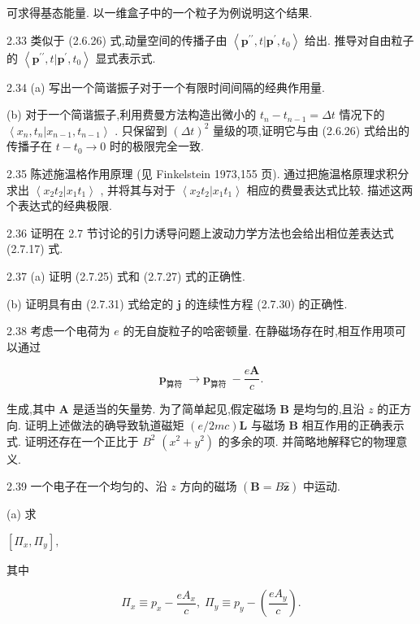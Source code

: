 \documentclass[lang=cn,newtx,10pt,scheme=chinese,thmcnt=section]{elegantbook}
\begin{document}
可求得基态能量. 以一维盒子中的一个粒子为例说明这个结果.

2.33 类似于 (2.6.26) 式,动量空间的传播子由 $\left\langle {{\mathbf{p}}^{\prime \prime }, t | {\mathbf{p}}^{\prime },{t}_{0}}\right\rangle$ 给出. 推导对自由粒子的 $\left\langle {{\mathbf{p}}^{\prime \prime }, t | {\mathbf{p}}^{\prime },{t}_{0}}\right\rangle$ 显式表示式.

2.34 (a) 写出一个简谐振子对于一个有限时间间隔的经典作用量.

(b) 对于一个简谐振子,利用费曼方法构造出微小的 ${t}_{n} - {t}_{n - 1} = {\Delta t}$ 情况下的 $\left\langle {{x}_{n},{t}_{n} | {x}_{n - 1},{t}_{n - 1}}\right\rangle$ . 只保留到 ${\left( \Delta t\right) }^{2}$ 量级的项,证明它与由 (2.6.26) 式给出的传播子在 $t - {t}_{0} \rightarrow 0$ 时的极限完全一致.

2.35 陈述施温格作用原理 (见 Finkelstein 1973,155 页). 通过把施温格原理求积分求出 $\left\langle {{x}_{2}{t}_{2} | {x}_{1}{t}_{1}}\right\rangle$ , 并将其与对于 $\left\langle {{x}_{2}{t}_{2} | {x}_{1}{t}_{1}}\right\rangle$ 相应的费曼表达式比较. 描述这两个表达式的经典极限.

2.36 证明在 2.7 节讨论的引力诱导问题上波动力学方法也会给出相位差表达式 (2.7.17) 式.

2.37 (a) 证明 (2.7.25) 式和 (2.7.27) 式的正确性.

(b) 证明具有由 (2.7.31) 式给定的 $\mathbf{j}$ 的连续性方程 (2.7.30) 的正确性.

2.38 考虑一个电荷为 $e$ 的无自旋粒子的哈密顿量. 在静磁场存在时,相互作用项可以通过

$$
{\mathbf{p}}_{\text{算符 }} \rightarrow {\mathbf{p}}_{\text{算符 }} - \frac{e\mathbf{A}}{c}.
$$

生成,其中 $\mathbf{A}$ 是适当的矢量势. 为了简单起见,假定磁场 $\mathbf{B}$ 是均匀的,且沿 $z$ 的正方向. 证明上述做法的确导致轨道磁矩 $\left( {e/{2mc}}\right) \mathbf{L}$ 与磁场 $\mathbf{B}$ 相互作用的正确表示式. 证明还存在一个正比于 ${B}^{2}$ $\left( {{x}^{2} + {y}^{2}}\right)$ 的多余的项. 并简略地解释它的物理意义.

2.39 一个电子在一个均匀的、沿 $z$ 方向的磁场 $\left( {\mathbf{B} = B\widehat{\mathbf{z}}}\right)$ 中运动.

(a) 求

$\left\lbrack {{\Pi }_{x},{\Pi }_{y}}\right\rbrack ,$

其中

$$
{\Pi }_{x} \equiv {p}_{x} - \frac{e{A}_{x}}{c},\;{\Pi }_{y} \equiv {p}_{y} - \left( \frac{e{A}_{y}}{c}\right) .
$$
\end{document}
